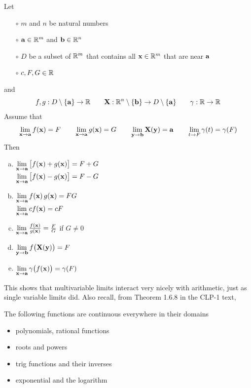 \begin{theorem}\label{thm LIMpptiesB}
Let 
\begin{itemize}\itemsep1pt \parskip0pt 
\item[$\circ$]
$m$ and $n$ be natural numbers
\item[$\circ$]
$\mathbf{a}\in\mathbb{R}^m$ and $\mathbf{b}\in\mathbb{R}^n$
\item[$\circ$] 
$D$ be a subset of $\mathbb{R}^m$ that contains all $\mathbf{x}\in\mathbb{R}^m$ that are near $\mathbf{a}$ 
\item[$\circ$]
$c,F,G\in\mathbb{R}$
\end{itemize}
and
\begin{equation*}
f,g:D\setminus\{\mathbf{a}\}\rightarrow\mathbb{R}\qquad
\mathbf{X}:\mathbb{R}^n\setminus\{\mathbf{b}\}\rightarrow D\setminus\{\mathbf{a}\}\qquad
\gamma:\mathbb{R}\rightarrow\mathbb{R}
\end{equation*}
Assume that
\begin{equation*}
\lim_{\mathbf{x}\to \mathbf{a}} f(\mathbf{x}) = F\qquad
\lim_{\mathbf{x}\to \mathbf{a}} g(\mathbf{x}) = G\qquad
\lim_{\mathbf{y}\to \mathbf{b}} \mathbf{X}(\mathbf{y}) = \mathbf{a}\qquad
\lim_{t\to F} \gamma(t) = \gamma(F) 
\end{equation*}
%
Then
\begin{enumerate}[(a)]
\item\qquad
$\lim\limits_{\mathbf{x}\rightarrow \mathbf{a}}\big[f(\mathbf{x})+g(\mathbf{x})\big]
         =F+G$\\
\null\qquad$\lim\limits_{\mathbf{x}\rightarrow \mathbf{a}}\big[f(\mathbf{x})-g(\mathbf{x})\big]
         =F-G$
\item\qquad
$\lim\limits_{\mathbf{x}\rightarrow \mathbf{a}} f(\mathbf{x})\,g(\mathbf{x})
         =FG$\\
\null\qquad$\lim\limits_{\mathbf{x}\rightarrow \mathbf{a}} cf(\mathbf{x})
         =cF$
\item\qquad
$\lim\limits_{\mathbf{x}\rightarrow \mathbf{a}} \frac{f(\mathbf{x})}{g(\mathbf{x})}
         =\frac{F}{G}$ if $G\ne 0$
\item\qquad
$\lim\limits_{\mathbf{y}\rightarrow \mathbf{b}} f\big(\mathbf{X}(\mathbf{y})\big)
         =F$
\item\qquad
$\lim\limits_{\mathbf{x}\rightarrow \mathbf{a}} \gamma\big(f(\mathbf{x})\big)
         =\gamma(F)$

\end{enumerate}
\end{theorem}
This shows that multivariable limits interact very nicely with arithmetic, 
just as single variable limits did. Also recall, from Theorem 1.6.8 in the
CLP-1 text, 
\begin{theorem}\label{thm one d continuity}
The following functions are continuous everywhere in their domains 
\begin{itemize}
\item polynomials, rational functions
\item roots and powers 
\item trig functions and their inverses
\item exponential and the logarithm
\end{itemize}
\end{theorem}

